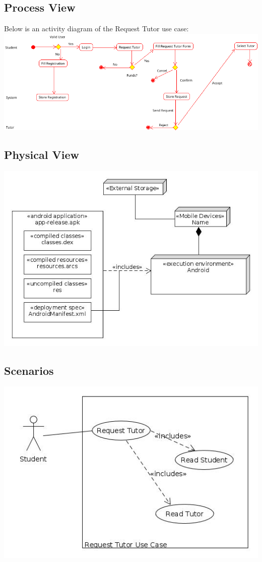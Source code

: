 \documentclass[12pt]{article}
\begin{document}
\subsection{Process View}
Below is an activity diagram of the Request Tutor use case:\\
\includegraphics[width=140mm]{./activitydiagram.png}
\subsection{Physical View}
\includegraphics[width=140mm]{./Deployment.jpg}
\subsection{Scenarios}
\includegraphics[width=140mm]{./RequestTutor.jpg}
\end{document}
